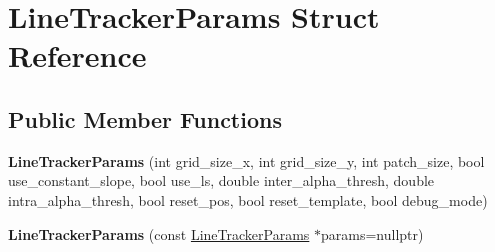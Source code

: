 \hypertarget{structLineTrackerParams}{\section{Line\-Tracker\-Params Struct Reference}
\label{structLineTrackerParams}
}
\subsection*{Public Member Functions}
\begin{DoxyCompactItemize}
\item 
\hypertarget{structLineTrackerParams_a967bafc6e5ecfe7b3aabcf5e78dd9ad8}{{\bfseries Line\-Tracker\-Params} (int grid\-\_\-size\-\_\-x, int grid\-\_\-size\-\_\-y, int patch\-\_\-size, bool use\-\_\-constant\-\_\-slope, bool use\-\_\-ls, double inter\-\_\-alpha\-\_\-thresh, double intra\-\_\-alpha\-\_\-thresh, bool reset\-\_\-pos, bool reset\-\_\-template, bool debug\-\_\-mode)}\label{structLineTrackerParams_a967bafc6e5ecfe7b3aabcf5e78dd9ad8}

\item 
\hypertarget{structLineTrackerParams_a159c67bc03c7b6da1359668fbbf7e759}{{\bfseries Line\-Tracker\-Params} (const \hyperlink{structLineTrackerParams}{Line\-Tracker\-Params} $\ast$params=nullptr)}\label{structLineTrackerParams_a159c67bc03c7b6da1359668fbbf7e759}

\end{DoxyCompactItemize}
